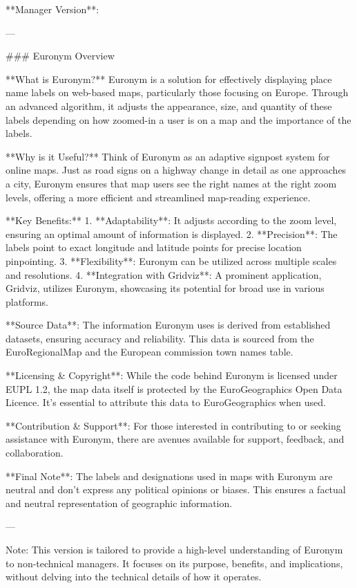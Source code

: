 **Manager Version**:

---

### Euronym Overview

**What is Euronym?**
Euronym is a solution for effectively displaying place name labels on web-based maps, particularly those focusing on Europe. Through an advanced algorithm, it adjusts the appearance, size, and quantity of these labels depending on how zoomed-in a user is on a map and the importance of the labels.

**Why is it Useful?**
Think of Euronym as an adaptive signpost system for online maps. Just as road signs on a highway change in detail as one approaches a city, Euronym ensures that map users see the right names at the right zoom levels, offering a more efficient and streamlined map-reading experience.

**Key Benefits:**
1. **Adaptability**: It adjusts according to the zoom level, ensuring an optimal amount of information is displayed.
2. **Precision**: The labels point to exact longitude and latitude points for precise location pinpointing.
3. **Flexibility**: Euronym can be utilized across multiple scales and resolutions.
4. **Integration with Gridviz**: A prominent application, Gridviz, utilizes Euronym, showcasing its potential for broad use in various platforms.

**Source Data**: 
The information Euronym uses is derived from established datasets, ensuring accuracy and reliability. This data is sourced from the EuroRegionalMap and the European commission town names table.

**Licensing & Copyright**: 
While the code behind Euronym is licensed under EUPL 1.2, the map data itself is protected by the EuroGeographics Open Data Licence. It's essential to attribute this data to EuroGeographics when used.

**Contribution & Support**: 
For those interested in contributing to or seeking assistance with Euronym, there are avenues available for support, feedback, and collaboration.

**Final Note**: 
The labels and designations used in maps with Euronym are neutral and don't express any political opinions or biases. This ensures a factual and neutral representation of geographic information.

---

Note: This version is tailored to provide a high-level understanding of Euronym to non-technical managers. It focuses on its purpose, benefits, and implications, without delving into the technical details of how it operates.